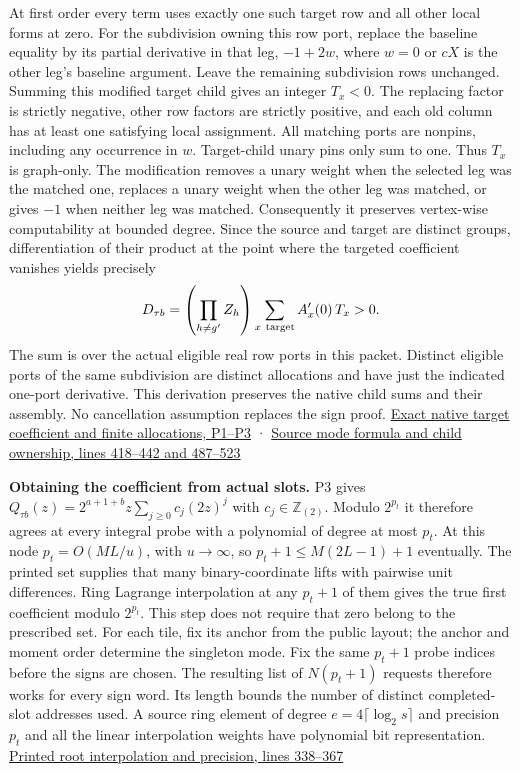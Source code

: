 \documentclass[
  11pt,
]{article}
\begin{document}
At first order every term uses exactly one such target row and all other
local forms at zero. For the subdivision owning this row port, replace
the baseline equality by its partial derivative in that leg, \(-1+2w\),
where \(w=0\) or \(c X\) is the other leg's baseline argument. Leave the
remaining subdivision rows unchanged. Summing this modified target child
gives an integer \(T_x<0\). The replacing factor is strictly negative,
other row factors are strictly positive, and each old column has at
least one satisfying local assignment. All matching ports are nonpins,
including any occurrence in \(w\). Target-child unary pins only sum to
one. Thus \(T_x\) is graph-only. The modification removes a unary weight
when the selected leg was the matched one, replaces a unary weight when
the other leg was matched, or gives \(-1\) when neither leg was matched.
Consequently it preserves vertex-wise computability at bounded degree.
Since the source and target are distinct groups, differentiation of
their product at the point where the targeted coefficient vanishes
yields precisely \[
                D_{\tau b}=
                   \left(\prod_{h\ne g'} Z_h\right)
                   \sum_{x\ {\rm target}} A'_x(0)\,T_x>0 .
\] The sum is over the actual eligible real row ports in this packet.
Distinct eligible ports of the same subdivision are distinct allocations
and have just the indicated one-port derivative. This derivation
preserves the native child sums and their assembly. No cancellation
assumption replaces the sign proof.
\hyperref[v9-section-precision-frontier]{Exact native target coefficient
and finite allocations, P1--P3} ·
\href{https://github.com/openai/math/blob/main/preprints/The-Exponential-Time-Hypothesis-is-False-October-25-2026/build/quantitative-contraction.tex\#L418}{Source
mode formula and child ownership, lines 418--442 and 487--523}

\textbf{Obtaining the coefficient from actual slots.} P3 gives
\(Q_{\tau b}(z)=2^{a+1+b}z\sum_{j\ge0}c_j(2z)^j\) with
\(c_j\in\mathbb Z_{(2)}\). Modulo \(2^{p_t}\) it therefore agrees at
every integral probe with a polynomial of degree at most \(p_t\). At
this node \(p_t=O(ML/u)\), with \(u\to\infty\), so
\(p_t+1\le M(2L-1)+1\) eventually. The printed set supplies that many
binary-coordinate lifts with pairwise unit differences. Ring Lagrange
interpolation at any \(p_t+1\) of them gives the true first coefficient
modulo \(2^{p_t}\). This step does not require that zero belong to the
prescribed set. For each tile, fix its anchor from the public layout;
the anchor and moment order determine the singleton mode. Fix the same
\(p_t+1\) probe indices before the signs are chosen. The resulting list of
\(N(p_t+1)\) requests therefore works for every sign word. Its length
bounds the number of distinct completed-slot addresses used. A source ring element of degree
\(e=4\lceil\log_2s\rceil\) and precision \(p_t\) and all the linear
interpolation weights have polynomial bit representation.
\href{https://github.com/openai/math/blob/main/preprints/The-Exponential-Time-Hypothesis-is-False-October-25-2026/build/quantitative-contraction.tex\#L338}{Printed
root interpolation and precision, lines 338--367}
\end{document}
